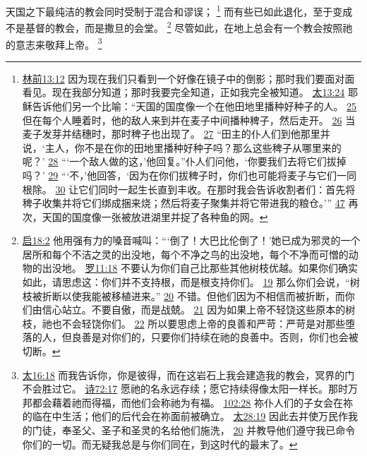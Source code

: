 \documentclass[12pt, a4paper, oneside]{ctexart}
\newcounter{parnum}[section]
\newcommand{\N}{%
   \noindent\refstepcounter{parnum}%
    \makebox[\parindent][l]{\textbf{\arabic{parnum}.}}}
\begin{document}
\N 天国之下最纯洁的教会同时受制于混合和谬误；
	\footnote {
		\href{https://biblehub.com/1_corinthians/13-12.htm}{林前13:12} 因为现在我们只看到一个好像在镜子中的倒影；那时我们要面对面看见。现在我部分知道；那时我要完全知道，正如我完全被知道。
		\href{https://biblehub.com/matthew/13-24.htm}{太13:24} 耶稣告诉他们另一个比喻：“天国的国度像一个在他田地里播种好种子的人。
        \href{https://biblehub.com/matthew/13-25.htm}{25} 但在每个人睡着时，他的敌人来到并在麦子中间播种稗子，然后走开。
        \href{https://biblehub.com/matthew/13-26.htm}{26} 当麦子发芽并结穗时，那时稗子也出现了。
        \href{https://biblehub.com/matthew/13-27.htm}{27} “田主的仆人们到他那里并说，‘主人，你不是在你的田地里播种好种子吗？那么这些稗子从哪里来的呢？’
        \href{https://biblehub.com/matthew/13-28.htm}{28} “‘一个敌人做的这，’他回复。”仆人们问他，‘你要我们去将它们拔掉吗？’
        \href{https://biblehub.com/matthew/13-29.htm}{29} “‘不，’他回答，‘因为在你们拔稗子时，你们也可能将麦子与它们一同根除。
        \href{https://biblehub.com/matthew/13-30.htm}{30} 让它们同时一起生长直到丰收。在那时我会告诉收割者们：首先将稗子收集并将它们绑成捆来烧；然后将麦子聚集并将它带进我的粮仓。’”
		\href{https://biblehub.com/matthew/13-47.htm}{47} 再次，天国的国度像一张被放进湖里并捉了各种鱼的网。
	}
	而有些已如此退化，至于变成不是基督的教会，而是撒旦的会堂。
	\footnote {
		\href{https://biblehub.com/revelation/18-2.htm}{启18:2} 他用强有力的嗓音喊叫：“‘倒了！大巴比伦倒了！’她已成为邪灵的一个居所和每个不洁之灵的出没地，每个不净之鸟的出没地，每个不净而可憎的动物的出没地。
		\href{https://biblehub.com/romans/11-18.htm}{罗11:18} 不要认为你们自己比那些其他树枝优越。如果你们确实如此，请思虑这：你们并不支持根，而是根支持你们。
		\href{https://biblehub.com/romans/11-19.htm}{19} 那么你们会说，“树枝被折断以使我能被移植进来。”
		\href{https://biblehub.com/romans/11-20.htm}{20} 不错。但他们因为不相信而被折断，而你们由信心站立。不要自傲，而是战兢。
		\href{https://biblehub.com/romans/11-21.htm}{21} 因为如果上帝不轻饶这些原本的树枝，祂也不会轻饶你们。
        \href{https://biblehub.com/romans/11-22.htm}{22} 所以要思虑上帝的良善和严苛：严苛是对那些堕落的人，但良善是对你们的，只要你们持续在祂的良善中。否则，你们也会被切断。
	}
	尽管如此，在地上总会有一个教会按照祂的意志来敬拜上帝。
	\footnote {
		\href{https://biblehub.com/matthew/16-18.htm}{太16:18} 而我告诉你，你是彼得，而在这岩石上我会建造我的教会，冥界的门不会胜过它。
		\href{https://biblehub.com/psalms/72-17.htm}{诗72:17} 愿祂的名永远存续；愿它持续得像太阳一样长。那时万邦都会藉着祂而得福，而他们会称祂为有福。
		\href{https://biblehub.com/psalms/102-28.htm}{102:28} 祢仆人们的子女会在祢的临在中生活；他们的后代会在祢面前被确立。
		\href{https://biblehub.com/matthew/28-19.htm}{太28:19} 因此去并使万民作我的门徒，奉圣父、圣子和圣灵的名给他们施洗，
		\href{https://biblehub.com/matthew/28-20.htm}{20} 并教导他们遵守我已命令你们的一切。而无疑我总是与你们同在，到这时代的最末了。
	}
\end{document}
